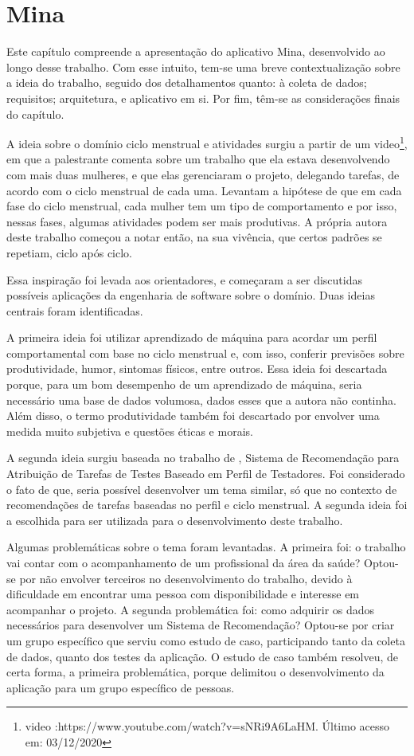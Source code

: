 \chapter[Mina]{Mina}
\label{ch:mina}

Este capítulo compreende a apresentação do aplicativo Mina, desenvolvido ao longo desse trabalho. 
Com esse intuito, tem-se uma breve contextualização sobre a ideia do trabalho, seguido dos 
detalhamentos quanto: à coleta de dados; requisitos; arquitetura, e aplicativo em si. Por fim, 
têm-se as considerações finais do capítulo.

A ideia sobre o domínio ciclo menstrual e atividades surgiu a 
partir de um video\footnote{video :https://www.youtube.com/watch?v=sNRi9A6LaHM. Último acesso em: 03/12/2020}, 
em que a palestrante comenta sobre um 
trabalho que ela estava desenvolvendo com mais duas  
mulheres, e que elas gerenciaram o projeto, delegando tarefas, de 
acordo com o ciclo menstrual de cada uma. Levantam a hipótese de 
que em cada fase do ciclo menstrual, cada mulher tem um tipo 
de comportamento e por isso, nessas fases, algumas atividades 
podem ser mais produtivas.
A própria autora deste trabalho começou a notar então, na sua 
vivência, que certos padrões se repetiam, ciclo após ciclo.

Essa inspiração foi levada aos 
orientadores, e começaram a ser discutidas possíveis aplicações da 
engenharia de software sobre o domínio. Duas ideias centrais 
foram identificadas. 

A primeira ideia foi utilizar aprendizado de máquina para 
acordar um perfil comportamental com base no ciclo menstrual e, 
com isso, conferir previsões sobre produtividade, humor, sintomas 
físicos, entre outros. Essa ideia foi descartada porque, para 
um bom desempenho de um aprendizado de máquina, seria necessário 
uma base de dados volumosa, dados esses que 
a autora não continha. Além disso, o termo produtividade também 
foi descartado por envolver uma medida muito subjetiva e questões éticas e morais. 

A segunda ideia surgiu baseada no trabalho de , Sistema de Recomendação para Atribuição de Tarefas de Testes 
Baseado em Perfil de Testadores. Foi considerado o fato de que, seria 
possível desenvolver um tema similar, só que no
contexto de recomendações de tarefas baseadas no perfil e 
ciclo menstrual. A segunda ideia foi a escolhida para ser 
utilizada para o desenvolvimento deste trabalho.

Algumas problemáticas sobre o tema foram levantadas. A primeira 
foi: o trabalho vai contar com o acompanhamento de um 
profissional da área da saúde? Optou-se por não envolver 
terceiros no desenvolvimento do trabalho, devido à dificuldade em encontrar uma pessoa 
com disponibilidade e interesse em 
acompanhar o projeto. A segunda problemática foi: 
como adquirir os dados necessários para desenvolver um 
Sistema de Recomendação? Optou-se por criar um grupo específico que serviu como
estudo de caso, participando tanto 
da coleta de dados, quanto dos testes da aplicação. O estudo de 
caso também resolveu, de certa forma, a primeira problemática, 
porque delimitou o desenvolvimento da aplicação para um grupo 
específico de pessoas.


